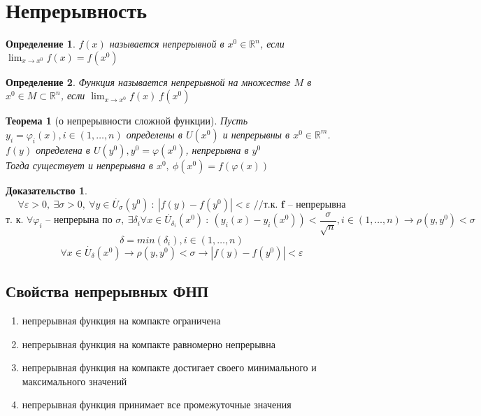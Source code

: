 \documentclass[a4paper, 12pt, titlepage, fleqn]{article}
\newtheorem{Def}{Определение}[section]
\newtheorem{Th}{Теорема}[section]
\newtheorem{Proof}{Доказательство}[section]
\newcommand{\Real}{\mathbb{R}}
\newcommand{\T}{\textbf}
\begin{document}
	\section{Непрерывность}
		\begin{Def}
			$f(x)$ называется непрерывной в $x^0 \in \Real^n$, если $\lim_{x\to x^0} f(x) = f(x^0)$
		\end{Def}
		\begin{Def}
			Функция называется непрерывной на множестве $M$ в $x^0 \in M \subset \Real^n$, если $\lim_{x\to x^0} f(x) \ f(x^0)$
		\end{Def}
		\begin{Th}[о непрерывности сложной функции]
			Пусть $y_i = \varphi_i(x), i \in (1, \dots, n)$ определены в $U(x^0)$ и непрерывны в $x^0 \in \Real^m$. $f(y)$ определена в $U(y^0), y^0 = \varphi(x^0)$, непрерывна в $y^0$\\
			Тогда существует и непрерывна в $x^0, \: \phi(x^0) = f(\varphi(x))$
		\end{Th}
		\begin{Proof}
			
			\[
				\forall \varepsilon > 0, \: \exists \sigma > 0, \: \forall y \in \dot{U_\sigma}(y^0) \:\colon\: |f(y) - f(y^0)| < \varepsilon \T{ //т.к. f -- непрерывна}
			\]
			\[
				\T{т. к. } \forall \varphi_i \T{ -- непрерына по } \sigma, \: \exists \delta_i \forall x \in \dot{U_{\delta_i}}(x^0) \: \colon \: (y_i(x) - y_i(x^0)) < \frac{\sigma}{\sqrt{n}}, i \in (1, \dots, n) \to \rho(y, y^0) < \sigma 
			\]
			\[
				\delta = min(\delta_i), i \in (1, \dots, n)
			\]
			\[
				\forall x \in \dot{U_\delta}(x^0) \to \rho(y, y^0) < \sigma \to |f(y) - f(y^0)| < \varepsilon
			\]
		\end{Proof}
		\subsection{Свойства непрерывных ФНП}
			\begin{enumerate}
				\item непрерывная функция на компакте ограничена
				\item непрерывная функция на компакте равномерно непрерывна
				\item непрерывная функция на компакте достигает своего минимального и максимального значений
				\item непрерывная функция принимает все промежуточные значения
			\end{enumerate}
\end{document}

